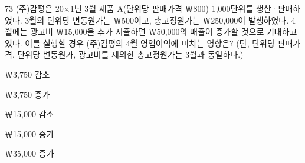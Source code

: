 \begin{question}{73}
(주)감평은 20×1년 3월 제품 A(단위당 판매가격 ￦800) 1,000단위를 생산·판매하였다. 3월의 단위당 변동원가는 ￦500이고, 총고정원가는 ￦250,000이 발생하였다. 4월에는 광고비 ￦15,000을 추가 지출하면 ￦50,000의 매출이 증가할 것으로 기대하고 있다. 이를 실행할 경우 (주)감평의 4월 영업이익에 미치는 영향은? (단, 단위당 판매가격, 단위당 변동원가, 광고비를 제외한 총고정원가는 3월과 동일하다.)
\begin{choices}
  \item ￦3,750 감소
  \item ￦3,750 증가
  \item ￦15,000 감소
  \item ￦15,000 증가
  \item ￦35,000 증가
\end{choices}
\end{question}

